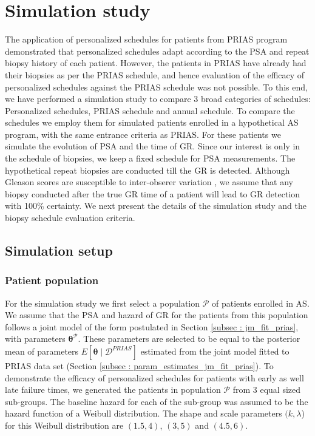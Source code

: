 
\section{Simulation study}
\label{sec: simulation_study}
The application of personalized schedules for patients from PRIAS program demonstrated that personalized schedules adapt according to the PSA and repeat biopsy history of each patient. However, the patients in PRIAS have already had their biopsies as per the PRIAS schedule, and hence evaluation of the efficacy of personalized schedules against the PRIAS schedule was not possible. To this end, we have performed a simulation study to compare 3 broad categories of schedules: Personalized schedules, PRIAS schedule and annual schedule. To compare the schedules we employ them for simulated patients enrolled in a hypothetical AS program, with the same entrance criteria as PRIAS. For these patients we simulate the evolution of PSA and the time of GR. Since our interest is only in the schedule of biopsies, we keep a fixed schedule for PSA measurements. The hypothetical repeat biopsies are conducted till the GR is detected. Although Gleason scores are susceptible to inter-obserer variation \citep{Gleason_interobs_var}, we assume that any biopsy conducted after the true GR time of a patient will lead to GR detection with 100\% certainty. We next present the details of the simulation study and the biopsy schedule evaluation criteria.

\subsection{Simulation setup}
\label{subsec : simulation_setup}
\subsubsection{Patient population}
For the simulation study we first select a population $\mathcal{P}$ of patients enrolled in AS. We assume that the PSA and hazard of GR for the patients from this population follows a joint model of the form postulated in Section \ref{subsec : jm_fit_prias}, with parameters $\boldsymbol{\theta}^{\mathcal{P}}$. These parameters are selected to be equal to the posterior mean of parameters $E[\boldsymbol{\theta} \mid \mathcal{D}^{PRIAS}]$ estimated from the joint model fitted to PRIAS data set (Section \ref{subsec : param_estimates_jm_fit_prias}). To demonstrate the efficacy of personalized schedules for patients with early as well late failure times, we generated the patients in population $\mathcal{P}$ from 3 equal sized sub-groups. The baseline hazard for each of the sub-group was assumed to be the hazard function of a Weibull distribution. The shape and scale parameters $(k, \lambda$) for this Weibull distribution are $(1.5, 4)$, $(3, 5)$ and $(4.5, 6)$.

